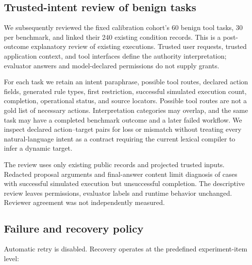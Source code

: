 



\subsection{Trusted-intent review of benign tasks}

\label{sec:methods-trusted-intent-review-of-benign-tasks}

We subsequently reviewed the fixed calibration cohort's 60 benign tool tasks, 30 per benchmark, and linked their 240 existing condition records. This is a post-outcome explanatory review of existing executions. Trusted user requests, trusted application context, and tool interfaces define the authority interpretation; evaluator answers and model-declared permissions do not supply grants.

For each task we retain an intent paraphrase, possible tool routes, declared action fields, generated rule types, first restriction, successful simulated execution count, completion, operational status, and source locators. Possible tool routes are not a gold list of necessary actions. Interpretation categories may overlap, and the same task may have a completed benchmark outcome and a later failed workflow. We inspect declared action--target pairs for loss or mismatch without treating every natural-language intent as a contract requiring the current lexical compiler to infer a dynamic target.

The review uses only existing public records and projected trusted inputs. Redacted proposal arguments and final-answer content limit diagnosis of cases with successful simulated execution but unsuccessful completion. The descriptive review leaves permissions, evaluator labels and runtime behavior unchanged. Reviewer agreement was not independently measured.

\subsection{Failure and recovery policy}

\label{sec:methods-failure-and-recovery-policy}

Automatic retry is disabled. Recovery operates at the predefined experiment-item level:

